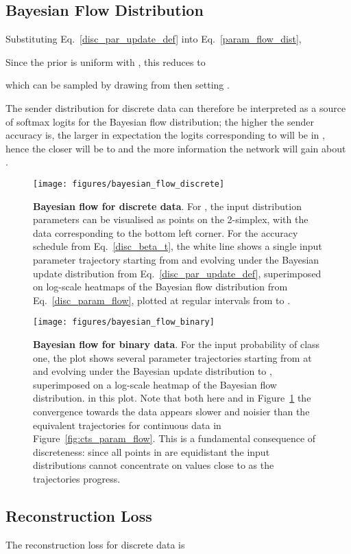 \documentclass[11pt,table]{article}
\newcommand{\0}[1]{\constvec{0}{#1}}
\newcommand{\1}[1]{\constvec{1}{#1}}
\begin{document}
\subsection{Bayesian Flow Distribution \texorpdfstring{}{}}
Substituting Eq.~\ref{disc_par_update_def} into Eq.~\ref{param_flow_dist},

Since the prior is uniform with , this reduces to

which can be sampled by drawing  from  then setting .

The sender distribution for discrete data can therefore be interpreted as a source of softmax logits for the Bayesian flow distribution; the higher the sender accuracy  is, the larger in expectation the logits corresponding to  will be in , hence the closer  will be to  and the more information the network will gain about .
\begin{figure}[t!]
\texttt{[image: figures/bayesian\_flow\_discrete]}
\caption{\textbf{Bayesian flow for discrete data}. For , the input distribution parameters  can be visualised as points on the 2-simplex, with the data  corresponding to the bottom left corner. For the accuracy schedule  from Eq.~\ref{disc_beta_t}, the white line shows a single input parameter trajectory starting from  and evolving under the Bayesian update distribution  from Eq.~\ref{disc_par_update_def}, superimposed on log-scale heatmaps of the Bayesian flow distribution  from Eq.~\ref{disc_param_flow}, plotted at regular intervals from  to .}
\label{fig:bayes_flow_disc}
\end{figure}
\begin{figure}[t!]
\texttt{[image: figures/bayesian\_flow\_binary]}
\caption{\textbf{Bayesian flow for binary data}.
For the input probability  of class one, the plot shows several parameter trajectories starting from  at  and evolving under the Bayesian update distribution to , superimposed on a log-scale heatmap of the Bayesian flow distribution.
 in this plot.
Note that both here and in Figure~\ref{fig:bayes_flow_disc} the convergence towards the data appears slower and noisier than the equivalent trajectories for continuous data in Figure~\ref{fig:cts_param_flow}. 
This is a fundamental consequence of discreteness: since all points in  are equidistant the input distributions cannot concentrate on values close to  as the trajectories progress.}
\label{fig:bayes_flow_bin}
\end{figure}
\subsection{Reconstruction Loss \texorpdfstring{}{}}\label{sec:disc_reconstruction}
The reconstruction loss for discrete data is
\end{document}

